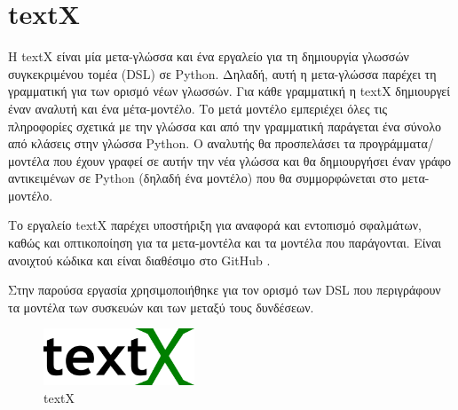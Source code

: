 \section{textX}
\label{sec:textx}

Η textX \cite{bib:textx} είναι μία μετα-γλώσσα και ένα εργαλείο για τη δημιουργία γλωσσών συγκεκριμένου τομέα (DSL) σε Python. Δηλαδή, αυτή η μετα-γλώσσα παρέχει τη γραμματική για των ορισμό νέων γλωσσών. Για κάθε γραμματική η textX δημιουργεί έναν αναλυτή και ένα μέτα-μοντέλο. Το μετά μοντέλο εμπεριέχει όλες τις πληροφορίες σχετικά με την γλώσσα και από την γραμματική παράγεται ένα σύνολο από κλάσεις στην γλώσσα Python. Ο αναλυτής θα προσπελάσει τα προγράμματα/μοντέλα που έχουν γραφεί σε αυτήν την νέα γλώσσα και θα δημιουργήσει έναν γράφο αντικειμένων σε Python (δηλαδή ένα μοντέλο) που θα συμμορφώνεται στο μετα-μοντέλο. 

Το εργαλείο textX παρέχει υποστήριξη για αναφορά και εντοπισμό σφαλμάτων, καθώς και οπτικοποίηση για τα μετα-μοντέλα και τα μοντέλα που παράγονται. Είναι ανοιχτού κώδικα και είναι διαθέσιμο στο GitHub .

Στην παρούσα εργασία χρησιμοποιήθηκε για τον ορισμό των DSL που περιγράφουν τα μοντέλα των συσκευών και των μεταξύ τους δυνδέσεων.

\begin{figure}[!ht]
  \centering
  \includegraphics[width=0.4\textwidth]{./images/chapter4/textx.png}
  \caption[textX]{textX\footnotemark}
  \label{fig:textx}
\end{figure}

